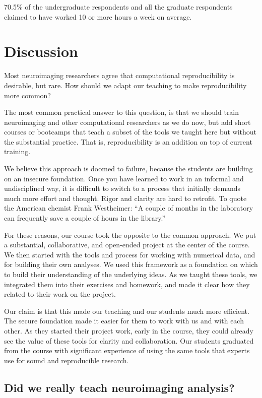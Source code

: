 70.5\% of the undergraduate respondents and all the graduate respondents
claimed to have worked 10 or more hours a week on average.

\section{Discussion}\label{discussion}

Most neuroimaging researchers agree that computational reproducibility is
desirable, but rare.  How should we adapt our teaching to make reproducibility
more common?

The most common practical answer to this question, is that we should train
neuroimaging and other computational researchers as we do now, but add short
courses or bootcamps that teach a subset of the tools we taught here but
without the substantial practice.  That is, reproducibility is an addition on
top of current training.

We believe this approach is doomed to failure, because the students are
building on an insecure foundation.  Once you have learned to work in an
informal and undisciplined way, it is difficult to switch to a process that
initially demands much more effort and thought.  Rigor and clarity are hard to
retrofit.
To quote the American chemist Frank Westheimer:
``A couple of months in the laboratory can frequently save a couple of hours
in the library.''

For these reasons, our course took the opposite to the common approach.
We put a substantial, collaborative, and open-ended project at the center of
the course.
We then started with the tools and process for working with numerical data, and
for building their own analyses.
We used this framework as a foundation on which to build their understanding of
the underlying ideas.
As we taught these tools, we integrated them into their exercises and homework,
and made it clear how they related to their work on the project.

Our claim is that this made our teaching and our students much more efficient.
The secure foundation made it easier for them to work with us and with each
other. As they started their project work, early in the course, they could
already see the value of these tools for clarity and collaboration. Our
students graduated from the course with significant experience of using the
same tools that experts use for sound and reproducible research.

\subsection{Did we really teach neuroimaging analysis?}

